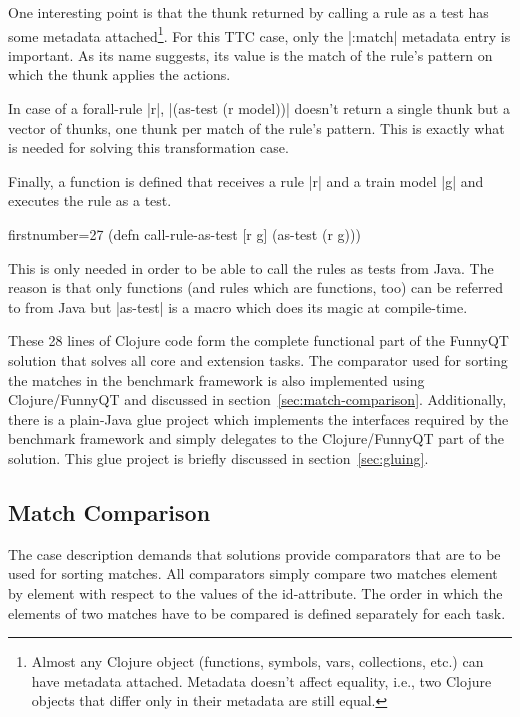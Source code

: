 \documentclass[submission]{eptcs}
\newcommand{\code}{\clojureinline}
\begin{document}
One interesting point is that the thunk returned by calling a rule as a test
has some metadata attached\footnote{Almost any Clojure object (functions,
  symbols, vars, collections, etc.) can have metadata attached.  Metadata
  doesn't affect equality, i.e., two Clojure objects that differ only in their
  metadata are still equal.}.  For this TTC case, only the \code|:match|
metadata entry is important.  As its name suggests, its value is the match of
the rule's pattern on which the thunk applies the actions.

In case of a forall-rule \code|r|, \code|(as-test (r model))| doesn't return a
single thunk but a vector of thunks, one thunk per match of the rule's pattern.
This is exactly what is needed for solving this transformation case.

Finally, a function is defined that receives a rule \code|r| and a train model
\code|g| and executes the rule as a test.

\begin{clojurecode*}{firstnumber=27}
(defn call-rule-as-test [r g]
  (as-test (r g)))
\end{clojurecode*}

This is only needed in order to be able to call the rules as tests from Java.
The reason is that only functions (and rules which are functions, too) can be
referred to from Java but \code|as-test| is a macro which does its magic at
compile-time.

These 28 lines of Clojure code form the complete functional part of the FunnyQT
solution that solves all core and extension tasks.  The comparator used for
sorting the matches in the benchmark framework is also implemented using
Clojure/FunnyQT and discussed in section~\vref{sec:match-comparison}.
Additionally, there is a plain-Java glue project which implements the
interfaces required by the benchmark framework and simply delegates to the
Clojure/FunnyQT part of the solution.  This glue project is briefly discussed
in section~\vref{sec:gluing}.


\subsection{Match Comparison}
\label{sec:match-comparison}

The case description demands that solutions provide comparators that are to be
used for sorting matches.  All comparators simply compare two matches element
by element with respect to the values of the \textsf{id}-attribute.  The order
in which the elements of two matches have to be compared is defined separately
for each task.
\end{document}
